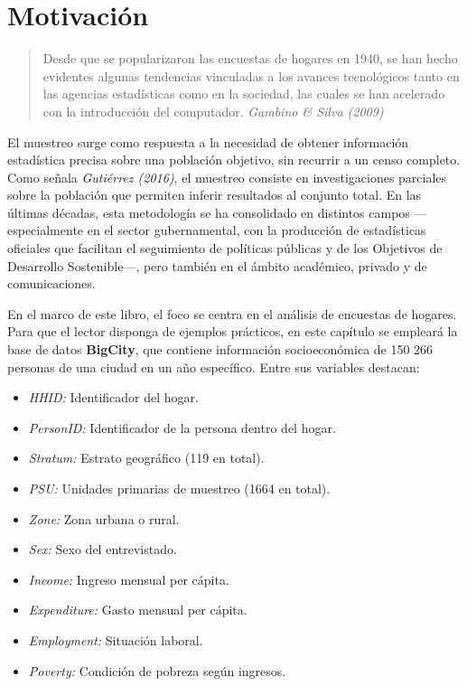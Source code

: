 \documentclass[
  12pt,
]{book}
\providecommand{\tightlist}{%
  \setlength{\itemsep}{0pt}\setlength{\parskip}{0pt}}
\begin{document}
\section{Motivación}\label{motivaciuxf3n}

\begin{quote}
Desde que se popularizaron las encuestas de hogares en 1940, se han hecho evidentes algunas tendencias vinculadas a los avances tecnológicos tanto en las agencias estadísticas como en la sociedad, las cuales se han acelerado con la introducción del computador.
\emph{Gambino \& Silva (2009)}
\end{quote}

El muestreo surge como respuesta a la necesidad de obtener información estadística precisa sobre una población objetivo, sin recurrir a un censo completo. Como señala \emph{Gutiérrez (2016)}, el muestreo consiste en investigaciones parciales sobre la población que permiten inferir resultados al conjunto total. En las últimas décadas, esta metodología se ha consolidado en distintos campos ---especialmente en el sector gubernamental, con la producción de estadísticas oficiales que facilitan el seguimiento de políticas públicas y de los Objetivos de Desarrollo Sostenible---, pero también en el ámbito académico, privado y de comunicaciones.

En el marco de este libro, el foco se centra en el análisis de encuestas de hogares. Para que el lector disponga de ejemplos prácticos, en este capítulo se empleará la base de datos \textbf{BigCity}, que contiene información socioeconómica de 150 266 personas de una ciudad en un año específico. Entre sus variables destacan:

\begin{itemize}
\tightlist
\item
  \emph{HHID:} Identificador del hogar.
\item
  \emph{PersonID:} Identificador de la persona dentro del hogar.
\item
  \emph{Stratum:} Estrato geográfico (119 en total).
\item
  \emph{PSU:} Unidades primarias de muestreo (1664 en total).
\item
  \emph{Zone:} Zona urbana o rural.
\item
  \emph{Sex:} Sexo del entrevistado.
\item
  \emph{Income:} Ingreso mensual per cápita.
\item
  \emph{Expenditure:} Gasto mensual per cápita.
\item
  \emph{Employment:} Situación laboral.
\item
  \emph{Poverty:} Condición de pobreza según ingresos.
\end{itemize}
\end{document}
